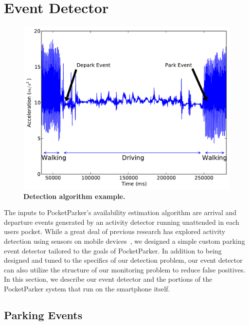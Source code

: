 \section{Event Detector}
\label{sec-detector}

\begin{figure}
\centering
\includegraphics[width=\columnwidth]{./figures/Detection.pdf}

\caption{\textbf{Detection algorithm example.} }

\label{fig-detectionexample}
\end{figure}

The inputs to PocketParker's availability estimation algorithm are arrival
and departure events generated by an activity detector running unattended in
each users pocket. While a great deal of previous research has explored
activity detection using sensors on mobile devices~\cite{FIXME}, we designed a
simple custom parking event detector tailored to the goals of PocketParker.
In addition to being designed and tuned to the specifics of our detection
problem, our event detector can also utilize the structure of our monitoring
problem to reduce false positives. In this section, we describe our event
detector and the portions of the PocketParker system that run on the
smartphone itself.

\subsection{Parking Events}
\label{subsec-goals}

